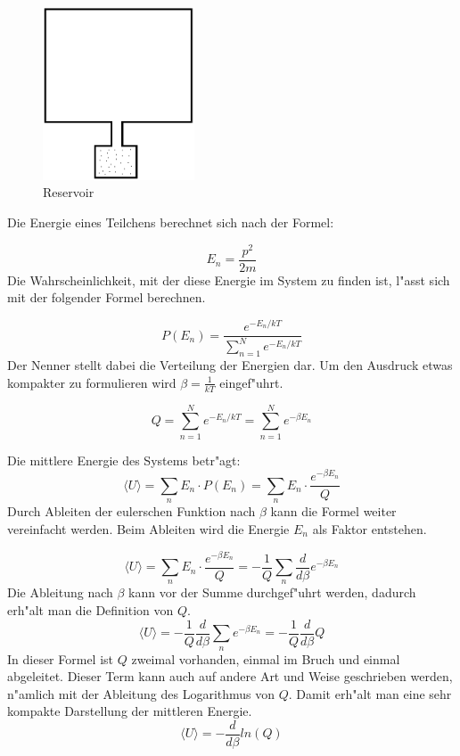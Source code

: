 \begin{refsection}
\begin{figure}
	\centering
	\includegraphics[width = 0.4\textwidth]{./bose/reservoir.png}
	\caption{Reservoir}
	\label{fig:reservoir}
\end{figure}
Die Energie eines Teilchens berechnet sich nach der Formel:

\begin{equation}
   E_n = \frac{p^2}{2m}
\end{equation}
Die Wahrscheinlichkeit, mit der diese Energie im System zu finden ist, l"asst sich mit der folgender Formel berechnen.

\begin{equation}
    P(E_n) = \frac{e^{-E_n/kT}}{\sum\limits_{n = 1}^{N} e^{-E_n/kT}}    
\end{equation}
Der Nenner stellt dabei die Verteilung der Energien dar. Um den Ausdruck etwas kompakter zu formulieren wird $ \beta = \frac{1}{kT}$ eingef"uhrt.

\begin{equation}
    Q = \sum\limits_{n = 1}^{N} e^{-E_n/kT} = \sum\limits_{n = 1}^{N} e^{-\beta E_n}
\end{equation}

Die mittlere Energie des Systems betr"agt:
\begin{equation}
    \langle U \rangle = \sum_{n} E_n \cdot P(E_n) = \sum_{n} E_n \cdot \frac{e^{-\beta E_n}}{Q}
\end{equation}
Durch Ableiten der eulerschen Funktion nach $\beta$ kann die Formel weiter vereinfacht werden. Beim Ableiten wird die Energie $E_n$ als Faktor entstehen.

\begin{equation*}
\langle U \rangle = \sum_{n} E_n \cdot \frac{e^{-\beta E_n}}{Q} = -\frac{1}{Q} \sum_{n} \frac{d}{d \beta} e^{-\beta E_n} 
\end{equation*}
Die Ableitung nach $\beta$ kann vor der Summe durchgef"uhrt werden, dadurch erh"alt man die Definition von $Q$.
\begin{equation*}
\langle U \rangle = -\frac{1}{Q} \frac{d}{d \beta} \sum_{n}  e^{-\beta E_n}  = -\frac{1}{Q} \frac{d}{d \beta}Q
\end{equation*}
In dieser Formel ist $Q$ zweimal vorhanden, einmal im Bruch und einmal abgeleitet. Dieser Term kann auch auf andere Art und Weise geschrieben werden, n"amlich mit der Ableitung des Logarithmus von $Q$. Damit erh"alt man eine sehr kompakte Darstellung der mittleren Energie.
\begin{equation}
\langle U \rangle = -\frac{d}{d \beta} ln(Q)
\end{equation}


\end{refsection}

